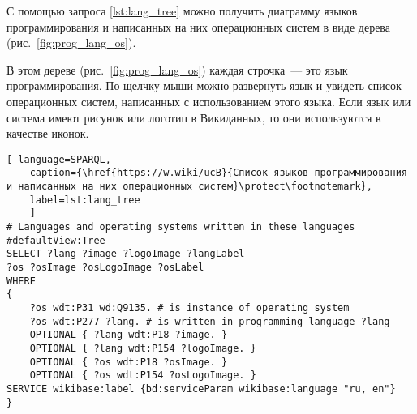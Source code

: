С помощью запроса \ref{lst:lang_tree} можно получить диаграмму языков программирования 
и написанных на них операционных систем в виде дерева (рис.~\ref{fig:prog_lang_os}).

\begin{marginfigure}[-5.0cm]
	{
		\setlength{\fboxsep}{0pt}%
		\setlength{\fboxrule}{1pt}%
	}
	\caption{Дерево языков программирования и написанных на них операционных систем.}
	\label{fig:prog_lang_os}%
\end{marginfigure}

В этом дереве (рис.~\ref{fig:prog_lang_os}) каждая строчка~--- это язык программирования. 
По щелчку мыши можно развернуть язык и увидеть список операционных систем, 
написанных с использованием этого языка. 
Если язык или система имеют рисунок или логотип в Викиданных, 
то они используются в качестве иконок.


\begin{lstlisting}[ language=SPARQL, 
	caption={\href{https://w.wiki/ucB}{Список языков программирования и написанных на них операционных систем}\protect\footnotemark},
	label=lst:lang_tree
	]
# Languages and operating systems written in these languages
#defaultView:Tree
SELECT ?lang ?image ?logoImage ?langLabel 
?os ?osImage ?osLogoImage ?osLabel 
WHERE 
{
	?os wdt:P31 wd:Q9135. # is instance of operating system
	?os wdt:P277 ?lang. # is written in programming language ?lang
	OPTIONAL { ?lang wdt:P18 ?image. }
	OPTIONAL { ?lang wdt:P154 ?logoImage. }
	OPTIONAL { ?os wdt:P18 ?osImage. }
	OPTIONAL { ?os wdt:P154 ?osLogoImage. }
SERVICE wikibase:label {bd:serviceParam wikibase:language "ru, en"}
}
\end{lstlisting}


